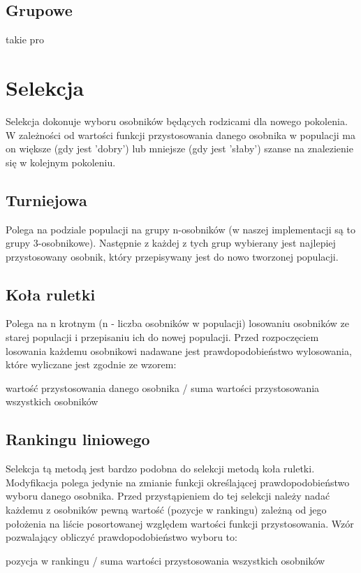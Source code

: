 \documentclass[11pt]{aghdpl}
\begin{document}
\section{Grupowe}
\label{sec:group}
takie pro

\chapter{Selekcja}
\label{cha:selection}
Selekcja dokonuje wyboru osobników będących rodzicami dla nowego pokolenia.
W zależności od wartości funkcji przystosowania danego osobnika w populacji ma on większe (gdy jest 'dobry') lub mniejsze 
(gdy jest 'słaby') szanse na znalezienie się w kolejnym pokoleniu. 
\section{Turniejowa}
\label{sec:tournament}
Polega na podziale populacji na grupy n-osobników (w naszej implementacji są to grupy 3-osobnikowe). Następnie z każdej z 
tych grup wybierany jest najlepiej przystosowany osobnik, który przepisywany jest do nowo tworzonej populacji.

\section{Koła ruletki}
\label{sec:roulette}
Polega na n krotnym (n - liczba osobników w populacji) losowaniu osobników ze starej populacji i przepisaniu ich do nowej 
populacji. Przed rozpoczęciem losowania każdemu osobnikowi nadawane jest prawdopodobieństwo wylosowania, które wyliczane 
jest zgodnie ze wzorem:
\begin{center}
wartość przystosowania danego osobnika / suma wartości przystosowania wszystkich osobników
\end{center}
 
\section{Rankingu liniowego}
\label{sec:linear}
Selekcja tą metodą jest bardzo podobna do selekcji metodą koła ruletki. Modyfikacja polega jedynie na zmianie funkcji 
określającej prawdopodobieństwo wyboru danego osobnika. Przed przystąpieniem do tej selekcji należy nadać każdemu z 
osobników pewną wartość (pozycje w rankingu) zależną od jego położenia na liście posortowanej względem wartości funkcji 
przystosowania. Wzór pozwalający obliczyć prawdopodobieństwo wyboru to:
\begin{center}
pozycja w rankingu / suma wartości przystosowania wszystkich osobników
\end{center}
\end{document}
